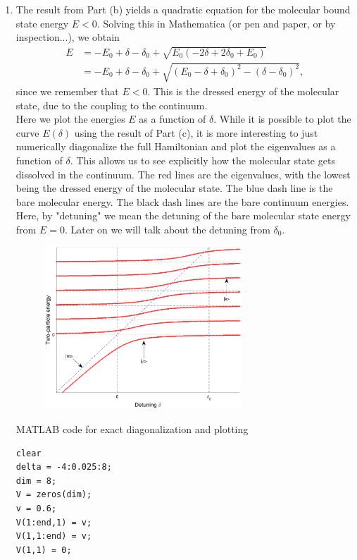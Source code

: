 \documentclass{article}
\theoremstyle{definition}
\begin{document}
\begin{enumerate}[label=(\alph*)]
\item The result from Part (b) yields a quadratic equation for the molecular bound state energy $E<0$. Solving this in Mathematica (or pen and paper, or by inspection...), we obtain 
\begin{align*}
E 
&= -E_0 + \delta - \delta_0 + \sqrt{E_0(-2\delta + 2\delta_0 + E_0)} \\ 
&= -E_0 + \delta - \delta_0 + \sqrt{(E_0 - \delta + \delta_0)^2 - (\delta - \delta_0)^2},
\end{align*}
since we remember that $E<0$. This is the dressed energy of the molecular state, due to the coupling to the continuum. \\


Here we plot the energies $E$ as a function of $\delta$. While it is possible to plot the curve $E(\delta)$ using the result of Part (c), it is more interesting to just numerically diagonalize the full Hamiltonian and plot the eigenvalues as a function of $\delta$. This allows us to see explicitly how the molecular state gets dissolved in the continuum. The red lines are the eigenvalues, with the lowest being the dressed energy of the molecular state. The blue dash line is the bare molecular energy. The black dash lines are the bare continuum energies. Here, by "detuning" we mean the detuning of the bare molecular state energy from $E=0$. Later on we will talk about the detuning from $\delta_0$.


\begin{figure}[!htb]
\centering
\includegraphics[width=0.7\textwidth]{Feshbach_resonance.eps}
\end{figure}




MATLAB code for exact diagonalization and plotting
\begin{lstlisting}
clear
delta = -4:0.025:8;
dim = 8;
V = zeros(dim);
v = 0.6;
V(1:end,1) = v;
V(1,1:end) = v;
V(1,1) = 0;


\end{lstlisting}
\end{enumerate}
\end{document}
